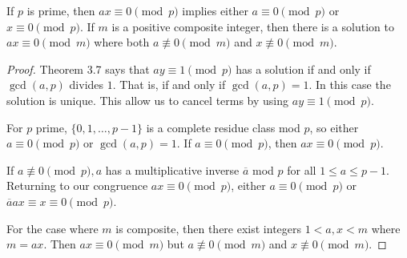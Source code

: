 \documentclass[letterpaper, 11 pt]{article}
\begin{document}
\begin{thm}
 If $p$ is prime, then $ax\equiv 0 \pmod p$ implies either $a\equiv 0 \pmod p$ or $x\equiv 0 \pmod p$. If $m$ is a positive composite integer, then there is a solution to $ax\equiv 0 \pmod m$ where both $a \not\equiv 0 \pmod m$ and $x\not\equiv 0 \pmod m$.
\end{thm}
\begin{proof} Theorem 3.7 says that $ay\equiv 1 \pmod p$ has a solution if and only if $\gcd(a,p)$ divides $1$. That is, if and only if $\gcd(a,p)=1$. In this case the solution is unique. This allow us to cancel terms by using $ay\equiv 1 \pmod p.$

For $p$ prime, $\{0,1,\dots, p-1\}$ is a complete residue class mod $p$, so either $a\equiv 0 \pmod p$ or $\gcd(a,p)=1$.
If $a\equiv 0 \pmod p$, then $ax\equiv 0 \pmod p$.

If $a\not\equiv 0 \pmod p, a$ has a multiplicative inverse $\overline{a}$ mod $p$ for all $1\leq a \leq p-1$. Returning to our congruence $ax\equiv 0 \pmod p$, either $a\equiv 0 \pmod p$ or $\overline{a}ax\equiv x\equiv 0\pmod p$.
 
For the case where $m$ is composite, then there exist integers $1<a,x<m$ where $m=ax$. Then $ax\equiv 0 \pmod m$ but $a\not\equiv 0 \pmod m$ and $x\not\equiv 0 \pmod m$.
\end{proof}
\end{document}
